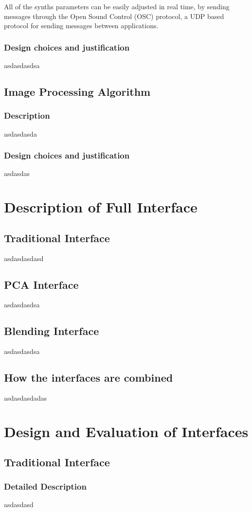 \documentclass[11pt, oneside]{report}   	%
\begin{document}
All of the synths parameters can be easily adjusted in real time, by sending messages through the Open Sound Control (OSC) protocol, a UDP based protocol for sending messages between applications.

\subsection{Design choices and justification}
asdasdasdsa
\section{Image Processing Algorithm}
\subsection{Description}
asdasdasda
\subsection{Design choices and justification}
asdasdas

\chapter{Description of Full Interface}
\section{Traditional Interface}
asdasdasdasd
\section{PCA Interface}
asdasdasdsa
\section{Blending Interface}
asdasdasdsa
\section{How the interfaces are combined}
asdasdasdadas

\chapter{Design and Evaluation of Interfaces}
\section{Traditional Interface}
\subsection{Detailed Description}
asdasdasd
\end{document}
